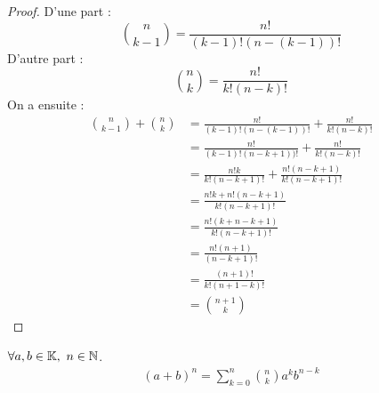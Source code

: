 \begin{proof}
	D'une part :
	\[ \binom{n}{k - 1} = \frac{n!}{(k-1)!(n - (k - 1))!} \]
	D'autre part :
	\[ \binom{n}{k} = \frac{n!}{k!(n - k)!} \]
	On a ensuite : 
	\begin{align*}
		\binom{n}{k - 1} + \binom{n}{k} &= 
		\frac{n!}{(k-1)!(n - (k - 1))!} + \frac{n!}{k!(n - k)!} \\
		&= \frac{n!}{(k-1)!(n - k + 1))!} + \frac{n!}{k!(n - k)!} \\
		&= \frac{n!k}{k!(n-k+1)!} + \frac{n!(n-k+1)}{k!(n-k+1)!} \\
		&= \frac{n!k + n!(n - k + 1)}{k!(n - k + 1)!} \\
		&= \frac{n!(k + n - k + 1)}{k!(n - k + 1)!} \\
		&= \frac{n!(n+1)}{(n - k + 1)!} \\
		&= \frac{(n+1)!}{k!(n + 1 - k)!} \\
		&= \binom{n+1}{k}
	\end{align*}
\end{proof}
	
\begin{proposition}
	$\forall a, b \in \mathbb{K},\ n \in \mathbb{N}$.
	\begin{align*}
		(a + b)^n = \sum_{k = 0}^{n} \binom{n}{k} a^kb^{n-k}
	\end{align*}
\end{proposition}


